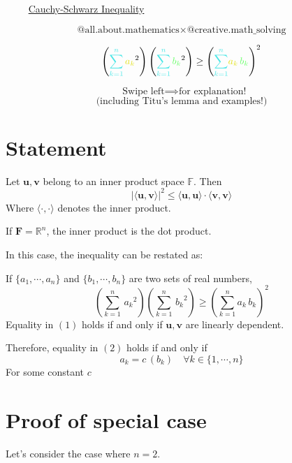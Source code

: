 \documentclass[12pt]{article}
\title{}
\author{}
\date{}
\begin{document}
\maketitle
\huge

\textcolor{myred}{$\qquad \!\!\!$ \underline{Cauchy-Schwarz Inequality}}

\small
\medskip
$$\text{@all.about.mathematics} \times
\text{@creative.math\_solving}$$

\large
$$\left(\textcolor{myblue}{\sum_{k=1}^{n}}\, \textcolor{myyellow}{a_{k}}^{2}\right)\left(\textcolor{myblue}{\sum_{k=1}^{n}}\, \textcolor{mygreen}{b_{k}}^{2}\right) \geq\left(\textcolor{myblue}{\sum_{k=1}^{n}}\textcolor{myyellow}{a_{k}} \,\textcolor{mygreen}{b_{k}}\right)^{2}$$
\LARGE

\vspace{3cm}
$$\quad \text{Swipe left} \implies \text{for explanation!} \:\:$$
\normalsize
$$\text{(including Titu's lemma and examples!)}$$

\newpage
\large
\section{Statement}
Let $\mathbf{u},\mathbf{v}$ belong to an inner product space $\mathbb{F}$. Then
\begin{equation} 
|\langle\mathbf{u}, \mathbf{v}\rangle|^{2} \leq\langle\mathbf{u}, \mathbf{u}\rangle \cdot\langle\mathbf{v}, \mathbf{v}\rangle
\end{equation}
Where $\langle \cdot , \cdot\rangle$ denotes the inner product.

\medskip
\noindent
If $\mathbf{F}=\mathbb{R}^n$, the inner product is the dot product.

\medskip
\noindent
In this case, the inequality can be restated as:

\medskip
\noindent
If $\{a_{1}, \cdots ,a_{n}\}$ and $\{b_{1}, \cdots ,b_{n}\}$ are two sets of real numbers,
\begin{equation}
\left({\sum_{k=1}^{n}}\, {a_{k}}^{2}\right)\left({\sum_{k=1}^{n}}\, {b_{k}}^{2}\right) \geq\left({\sum_{k=1}^{n}}{a_{k}} \,{b_{k}}\right)^{2}
\end{equation}
Equality in $(1)$ holds if and only if $\mathbf{u},\mathbf{v}$ are linearly dependent.

\medskip
\noindent
Therefore, equality in $(2)$ holds if and only if
$$a_k=c\,(b_k) \quad \forall k\in\{1,\cdots,n\}$$
For some constant $c$

\newpage
\section{Proof of special case}
Let's consider the case where $n=2$.
\end{document}
